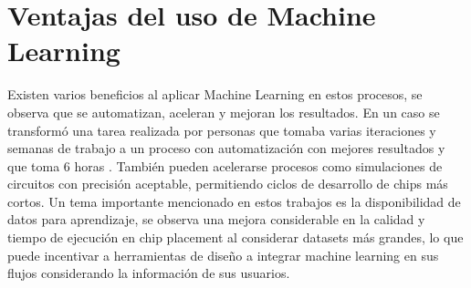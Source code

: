 \documentclass[journal]{IEEEtran}
\begin{document}
\section{Ventajas del uso de Machine Learning}

Existen varios beneficios al aplicar Machine Learning en estos procesos, se observa que se automatizan, aceleran y mejoran los resultados. En un caso se transformó una tarea realizada por personas que tomaba varias iteraciones y semanas de trabajo a un proceso con automatización con mejores resultados y que toma 6 horas \cite{mirhoseini2020chip}. También pueden acelerarse procesos como simulaciones de circuitos con precisión aceptable, permitiendo ciclos de desarrollo de chips más cortos. Un tema importante mencionado en estos trabajos es la disponibilidad de datos para aprendizaje, se observa una mejora considerable en la calidad y tiempo de ejecución en chip placement al considerar datasets más grandes, lo que puede incentivar a herramientas de diseño a integrar machine learning en sus flujos considerando la información de sus usuarios. 








%


\printbibliography
\end{document}
